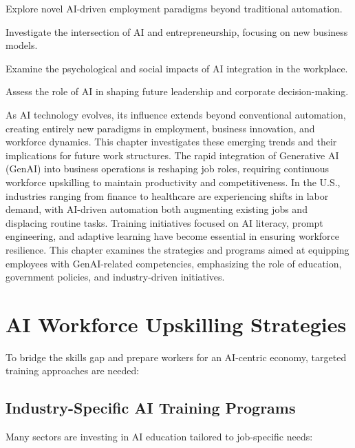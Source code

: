 \documentclass[a4paper,headinclude=on,footinclude=on,12pt,oneside]{scrbook}
\begin{document}
\begin{arrows}
	\item Explore novel AI-driven employment paradigms beyond traditional automation.
	\item Investigate the intersection of AI and entrepreneurship, focusing on new business models.
	\item Examine the psychological and social impacts of AI integration in the workplace.
	\item Assess the role of AI in shaping future leadership and corporate decision-making.
\end{arrows}


As AI technology evolves, its influence extends beyond conventional automation, creating entirely new paradigms in employment, business innovation, and workforce dynamics. This chapter investigates these emerging trends and their implications for future work structures.
The rapid integration of Generative AI (GenAI) into business operations is reshaping job roles, requiring continuous workforce upskilling to maintain productivity and competitiveness. In the U.S., industries ranging from finance to healthcare are experiencing shifts in labor demand, with AI-driven automation both augmenting existing jobs and displacing routine tasks. Training initiatives focused on AI literacy, prompt engineering, and adaptive learning have become essential in ensuring workforce resilience. This chapter examines the strategies and programs aimed at equipping employees with GenAI-related competencies, emphasizing the role of education, government policies, and industry-driven initiatives.


\section{AI Workforce Upskilling Strategies}

To bridge the skills gap and prepare workers for an AI-centric economy, targeted training approaches are needed:

\subsection{Industry-Specific AI Training Programs}

Many sectors are investing in AI education tailored to job-specific needs:
\end{document}
